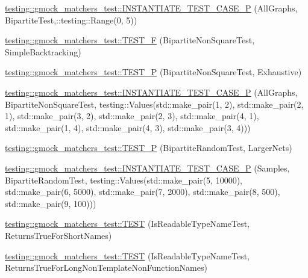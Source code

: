 \begin{DoxyCompactItemize}
\item 
\hyperlink{namespacetesting_1_1gmock__matchers__test_a3ca71a91f2b60ab08922acb7da0f8df0}{testing\+::gmock\+\_\+matchers\+\_\+test\+::\+I\+N\+S\+T\+A\+N\+T\+I\+A\+T\+E\+\_\+\+T\+E\+S\+T\+\_\+\+C\+A\+S\+E\+\_\+P} (All\+Graphs, Bipartite\+Test,\+::testing\+::\+Range(0, 5))
\item 
\hyperlink{namespacetesting_1_1gmock__matchers__test_a7d2395b1cb6a90bdc8d46ae06f99f6c7}{testing\+::gmock\+\_\+matchers\+\_\+test\+::\+T\+E\+S\+T\+\_\+F} (Bipartite\+Non\+Square\+Test, Simple\+Backtracking)
\item 
\hyperlink{namespacetesting_1_1gmock__matchers__test_a3ac913ed55a7ac2636ae7bfce04296e9}{testing\+::gmock\+\_\+matchers\+\_\+test\+::\+T\+E\+S\+T\+\_\+P} (Bipartite\+Non\+Square\+Test, Exhaustive)
\item 
\hyperlink{namespacetesting_1_1gmock__matchers__test_a64ef722e930c3088ddea704ac20194b5}{testing\+::gmock\+\_\+matchers\+\_\+test\+::\+I\+N\+S\+T\+A\+N\+T\+I\+A\+T\+E\+\_\+\+T\+E\+S\+T\+\_\+\+C\+A\+S\+E\+\_\+P} (All\+Graphs, Bipartite\+Non\+Square\+Test, testing\+::\+Values(std\+::make\+\_\+pair(1, 2), std\+::make\+\_\+pair(2, 1), std\+::make\+\_\+pair(3, 2), std\+::make\+\_\+pair(2, 3), std\+::make\+\_\+pair(4, 1), std\+::make\+\_\+pair(1, 4), std\+::make\+\_\+pair(4, 3), std\+::make\+\_\+pair(3, 4)))
\item 
\hyperlink{namespacetesting_1_1gmock__matchers__test_ace6351a5a34b746491458140b06534ed}{testing\+::gmock\+\_\+matchers\+\_\+test\+::\+T\+E\+S\+T\+\_\+P} (Bipartite\+Random\+Test, Larger\+Nets)
\item 
\hyperlink{namespacetesting_1_1gmock__matchers__test_a857f48ffb1fc6f5ce61aec79b5c94da8}{testing\+::gmock\+\_\+matchers\+\_\+test\+::\+I\+N\+S\+T\+A\+N\+T\+I\+A\+T\+E\+\_\+\+T\+E\+S\+T\+\_\+\+C\+A\+S\+E\+\_\+P} (Samples, Bipartite\+Random\+Test, testing\+::\+Values(std\+::make\+\_\+pair(5, 10000), std\+::make\+\_\+pair(6, 5000), std\+::make\+\_\+pair(7, 2000), std\+::make\+\_\+pair(8, 500), std\+::make\+\_\+pair(9, 100)))
\item 
\hyperlink{namespacetesting_1_1gmock__matchers__test_aef0bf5f855b1e75c63ec45408b5a23ba}{testing\+::gmock\+\_\+matchers\+\_\+test\+::\+T\+E\+ST} (Is\+Readable\+Type\+Name\+Test, Returns\+True\+For\+Short\+Names)
\item 
\hyperlink{namespacetesting_1_1gmock__matchers__test_a839515535e3e75d4f80ba6ae8f7347ec}{testing\+::gmock\+\_\+matchers\+\_\+test\+::\+T\+E\+ST} (Is\+Readable\+Type\+Name\+Test, Returns\+True\+For\+Long\+Non\+Template\+Non\+Function\+Names)

\end{DoxyCompactItemize}
